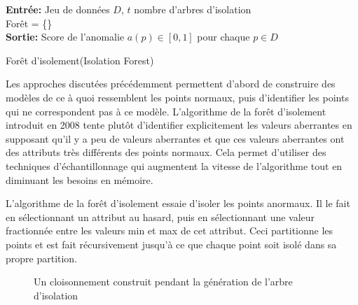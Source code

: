 \begin{algorithm}[h]
\SetAlgoLined
\textbf{Entrée:} Jeu de données $D$,  $t$ nombre d'arbres d'isolation %
\\Forêt = \{\}
\\
\For{$p \in D$}{
$PathLengths = \{\}$
\\\For{Arbre en forêt}{
Trouver la longueur du chemin $\ell$ de la racine de l'arbre au nœud $\{p\}$
\\Ajouter $\ell$ to $PathLengths$
}
$AveragePathLength = \frac{\sum_{\ell \in PathLengths} \ell}{t}$
\\Poser $a(p) = 2^{- \frac{AveragePathLength}{c(|D|)}} $
}
\textbf{Sortie:} Score de l'anomalie $a(p) \in [0,1]$ pour chaque $p \in D$
\caption{Forêt d'isolement(Isolation Forest)}
\end{algorithm}

Les approches discutées précédemment permettent d'abord de construire des modèles de ce à quoi ressemblent les points normaux, puis d'identifier les points qui ne correspondent pas à ce modèle.
L'algorithme de la forêt d'isolement \cite{A15} introduit en 2008 tente plutôt d'identifier explicitement les valeurs aberrantes en supposant qu'il y a peu de valeurs aberrantes et que ces valeurs aberrantes ont des attributs très différents des points normaux.
Cela permet d'utiliser des techniques d'échantillonnage qui augmentent la vitesse de l'algorithme tout en diminuant les besoins en mémoire.

L'algorithme de la forêt d'isolement essaie d'isoler les points anormaux.
Il le fait en sélectionnant un attribut au hasard, puis en sélectionnant une valeur fractionnée entre les valeurs min et max de cet attribut.
Ceci partitionne les points et est fait récursivement jusqu'à ce que chaque point soit isolé dans sa propre partition.

\begin{figure}[h]
\centering
{}
\caption{Un cloisonnement construit pendant la génération de l'arbre d'isolation}
\label{isolationtree}
\end{figure}

